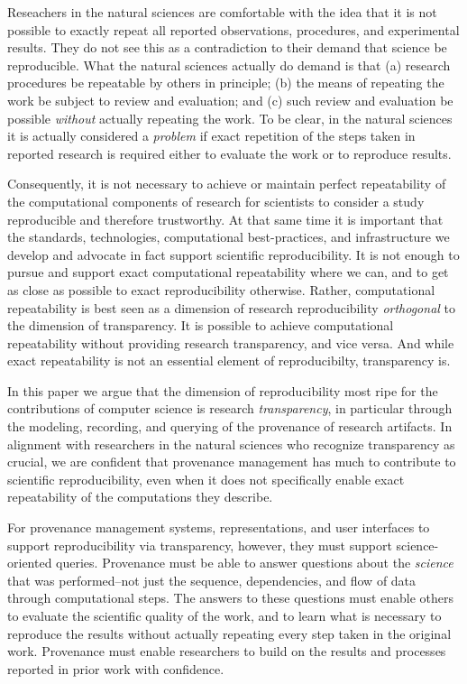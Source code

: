  Reseachers in the natural sciences are comfortable with the idea that it is not possible to exactly
	repeat all reported observations, procedures, and experimental results.
They do not see this as a contradiction to their demand that science be reproducible.
What the natural sciences actually do demand is that 
	(a) research procedures be repeatable by others in principle;
	(b) the means of repeating the work be subject to review and evaluation; 
	and (c) such review and evaluation be possible \emph{without} actually repeating the work.
To be clear, in the natural sciences it is actually considered a \emph{problem} if exact repetition of the steps
	taken in reported research is required either to evaluate the work or to reproduce results.

Consequently, it is not necessary to achieve or 
	maintain perfect repeatability of the computational components of research for scientists to 
	consider a study reproducible and therefore trustworthy.
At that same time it is important that the standards, technologies, 
	computational best-practices, and infrastructure we develop and advocate in fact support scientific reproducibility.
It is not enough to pursue and support exact computational repeatability where we can, and to get as close
	as possible to exact reproducibility otherwise.
Rather, computational repeatability is best seen as a dimension of research reproducibility \emph{orthogonal} to 
	the dimension of transparency.
It is possible to achieve computational repeatability without providing research transparency, and vice versa.
And while exact repeatability is not an essential element of reproducibilty, transparency is.

In this paper we argue that the dimension of reproducibility most ripe for the contributions of computer science 
	is research \emph{transparency}, in particular through the modeling, recording, and querying of the provenance of research artifacts.
In alignment with researchers in the natural sciences who recognize transparency as crucial,
	we are confident that provenance management has much to contribute to scientific reproducibility,
	 even when it does not specifically enable exact repeatability of the computations they describe.

For provenance management systems, representations, and user interfaces to support reproducibility via transparency,
	however, they must support science-oriented queries.
Provenance must be able to answer questions about the \emph{science} that was performed--not just the 
	sequence, dependencies, and flow of data through computational steps.
The answers to these questions must enable others to evaluate the scientific quality of the work, and to learn what is necessary to 
	reproduce the results without actually repeating every step taken in the original work.
Provenance must enable researchers to build on the results and processes reported in prior work with confidence.

